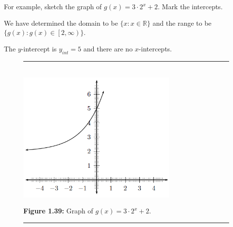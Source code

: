 \label{m39348*id252808}For example, sketch the graph of $g\left(x\right)=3\ensuremath{\cdot}{2}^{x}+2$. Mark the intercepts.\par 
\label{m39348*id252849}We have determined the domain to be $\{x:x\in \mathbb{R}\}$ and the range to be $\{g\left(x\right):g\left(x\right)\in \left[2,\infty \right)\}$.\par 
\label{m39348*id252925}The $y$-intercept is ${y}_{int}=5$ and there are no $x$-intercepts.\par 
\setcounter{subfigure}{0}
\begin{figure}[H] %
\begin{center}
\rule[.1in]{\figurerulewidth}{.005in} \\
\label{m39348*uid196!!!underscore!!!media}\label{m39348*uid196!!!underscore!!!printimage}\includegraphics[width=300px]{col11306.imgs/m39348_MG10C11_032.png} %
\vspace{2pt}
\vspace{\rubberspace}\par \begin{cnxcaption}
\small \textbf{Figure 1.39: }Graph of $g\left(x\right)=3\ensuremath{\cdot}{2}^{x}+2$.
\end{cnxcaption}
\vspace{.1in}
\rule[.1in]{\figurerulewidth}{.005in} \\
\end{center}
\end{figure}       
\par
\label{m39348*eid78823}\vspace{.5cm} 
\noindent
